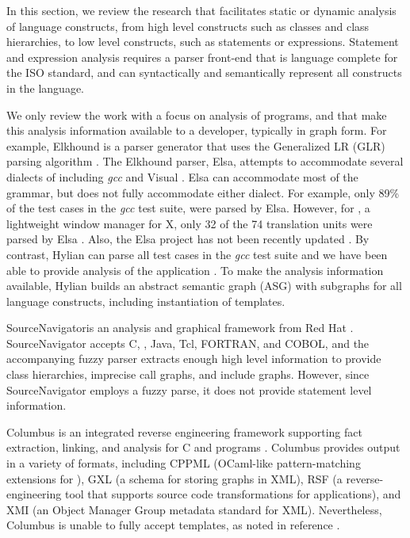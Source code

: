 
In this section, we review the research that facilitates static or 
dynamic analysis of {\CPP} language constructs, from high level
constructs such as classes and class hierarchies, to low level
constructs, such as statements or expressions.
Statement and expression analysis requires a parser front-end that
is language complete for the ISO standard, and can syntactically
and semantically represent all constructs in the language. 

We only review the work with a focus on analysis of {\CPP}
programs, and that make this analysis information available to
a developer, typically in graph form.
For example, Elkhound is a parser generator that uses the Generalized 
LR (GLR) parsing algorithm \cite{elsa2007,tomita85,vandenbrand98}.
The Elkhound parser, Elsa, attempts to accommodate several dialects 
of {\CPP} including {\em gcc} and Visual {\CPP} \cite{elsa2007}.
Elsa can accommodate most of the {\CPP} grammar,
but does not fully accommodate either dialect.
For example, only 89\% of the test cases in the {\em gcc} test suite, 
were parsed by Elsa. However, for {\Fluxbox}, a lightweight
window manager for X, only 32 of the 74 translation units were 
parsed by Elsa \cite{www-fluxbox}.  Also, the Elsa project has 
not been recently updated \cite{elsa2007}.
By contrast, Hylian can parse all test cases in the {\em gcc} test
suite and we have been able to provide analysis of the {\Fluxbox}
application \cite{kraft-tse}. 
To make the analysis information available, Hylian
builds an abstract semantic graph (ASG) with subgraphs for all
{\CPP} language constructs, including instantiation of templates.

{\sf SourceNavigator}\texttrademark is an analysis and graphical 
framework from Red Hat \cite{sourcenav}. SourceNavigator 
accepts C, {\CPP}, Java, Tcl, FORTRAN, and COBOL, and the 
accompanying fuzzy parser extracts enough high level information to 
provide class hierarchies, imprecise call graphs, and include graphs.
However, since {\sf SourceNavigator} employs a fuzzy parse, it
does not provide statement level information.

{\sf Columbus} is an integrated reverse engineering framework 
supporting fact extraction, linking, and analysis for C and {\CPP} 
programs \cite{columbus2005}. 
{\sf Columbus} provides output in a variety of formats, including
{CPPML} (OCaml-like pattern-matching extensions for {\CPP}),
{GXL} (a schema for storing graphs in XML), {RSF} (a reverse-engineering
tool that supports source code transformations for {\CPP} applications),
and {XMI} (an Object Manager Group metadata standard for XML).
Nevertheless, {\sf Columbus} is unable to fully accept templates,
as noted in reference \cite{tuanalyzer04}.


